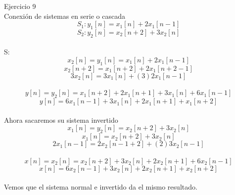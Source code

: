 \documentclass[a4paper,openright,12pt]{report}
\begin{document}
Ejercicio 9\\

Conexión de sistemas en serie o cascada\\
\begin{equation}
S_{1}: y_{1}\left [ n \right ]=x_{1}\left [ n \right ]+2x_{1}\left [ n-1 \right ]
\end{equation}
\begin{equation}
S_{2}: y_{2}\left [ n \right ]=x_{2}\left [ n+2 \right ]+3x_{2}\left [ n \right ]
\end{equation}\\

S:\\
\begin{equation}
x_{2}\left [ n \right ]=y_{1}\left [ n \right ]=x_{1}\left [ n \right ]+2x_{1}\left [ n-1 \right ]
\end{equation}
\begin{equation}
x_{2}\left [ n+2 \right ]=x_{1}\left [ n+2 \right ]+2x_{1}\left [ n+2-1 \right ]
\end{equation}
\begin{equation}
3x_{2}\left [ n \right ]=3x_{1}\left [ n \right ]+(3)2x_{1}\left [ n-1 \right ]
\end{equation}\\

\begin{equation}
y\left [ n \right ]=y_{2}\left [ n \right ]=x_{1}\left [ n+2 \right ]+2x_{1}\left [ n+1 \right ]+3x_{1}\left [ n \right ]+6x_{1}\left [ n-1 \right ]
\end{equation}
\begin{equation}
y\left [ n \right ]=6x_{1}\left [ n-1 \right ]+3x_{1}\left [ n \right ]+2x_{1}\left [ n+1 \right ]+x_{1}\left [ n+2 \right ]
\end{equation}\\

Ahora sacaremos su sistema invertido\\
\begin{equation}
x_{1}\left [ n \right ]=y_{2}\left [ n \right ]=x_{2}\left [ n+2 \right ]+3x_{2}\left [ n \right ]
\end{equation}
\begin{equation}
x_{1}\left [ n \right ]=x_{2}\left [ n+2 \right ]+3x_{2}\left [ n \right ]
\end{equation}
\begin{equation}
2x_{1}\left [ n-1 \right ]=2x_{2}\left [ n-1+2 \right ]+(2)3x_{2}\left [ n-1 \right ]
\end{equation}\\

\begin{equation}
x\left [ n \right ]=x_{2}\left [ n \right ]=x_{2}\left [ n+2 \right ]+3x_{2}\left [ n \right ]+2x_{2}\left [ n+1 \right ]+6x_{2}\left [ n-1 \right ]
\end{equation}
\begin{equation}
x\left [ n \right ]=6x_{2}\left [ n-1 \right ]+3x_{2}\left [ n \right ]+2x_{2}\left [ n+1 \right ]+x_{2}\left [ n+2 \right ]
\end{equation}\\

Vemos que el sistema normal e invertido da el mismo resultado.
\end{document}
